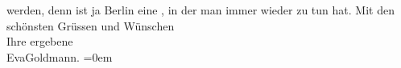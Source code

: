 \begin{ledgroupsized}[t]{13cm}
               werden, denn \label{K_L03542-3v}\label{K_L03542-3h} ist ja Berlin eine \label{T_L03542-1v}\label{T_L03542-1h}, in der man immer wieder zu tun hat.\pend
           \pstart
           Mit den schönsten Grüssen und Wünschen {\\[\baselineskip]}Ihre ergebene {\\[\baselineskip]}\spacefill\mbox{EvaGoldmann.}\pend
           \leftskip=0em{}
         
         \endnumbering{}\end{ledgroupsized}  \newcommand{\dateiname}{L03542}\newcommand{\titel}{Eva Marie Goldmann an Arthur Schnitzler, 1. 1. 1927}\newcommand{\editorInnen}{Martin Anton Müller und Laura Untner}
      